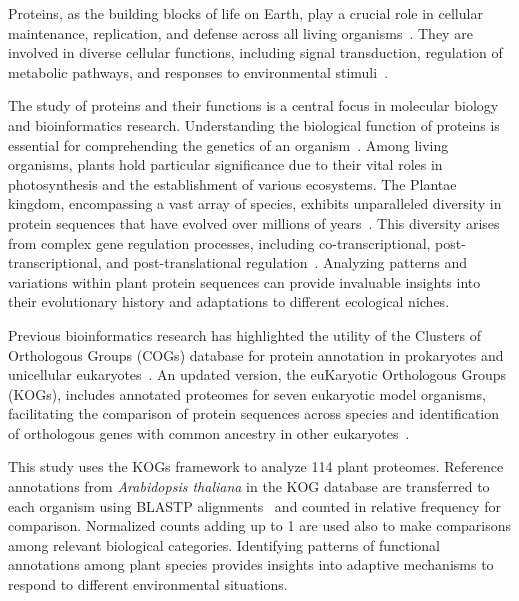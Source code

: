 Proteins, as the building blocks of life on Earth, play a crucial 
role in cellular maintenance, replication, and defense across all 
living organisms~\citep{kaur2022}. They are involved in diverse 
cellular functions, including signal transduction, regulation 
of metabolic pathways, and responses to environmental 
stimuli~\citep{zhang2010}.

The study of proteins and their functions is a central focus in 
molecular biology and bioinformatics research. Understanding the 
biological function of proteins is essential for comprehending 
the genetics of an organism~\citep{silva2020}. Among living 
organisms, plants hold particular significance due to their 
vital roles in photosynthesis and the establishment of various 
ecosystems. The Plantae kingdom, encompassing a vast array of 
species, exhibits unparalleled diversity in protein sequences 
that have evolved over millions of years~\citep{chaudhary2019}. 
This diversity arises from complex gene regulation processes, 
including co-transcriptional, post-transcriptional, and 
post-translational regulation~\citep{skelly2016}. Analyzing 
patterns and variations within plant protein sequences can 
provide invaluable insights into their evolutionary history 
and adaptations to different ecological niches.

Previous bioinformatics research has highlighted the utility 
of the Clusters of Orthologous Groups (COGs) database for 
protein annotation in prokaryotes and unicellular 
eukaryotes~\citep{tatusov1997,tatusov2001}. An updated version, 
the euKaryotic Orthologous Groups (KOGs), includes annotated 
proteomes for seven eukaryotic model organisms, facilitating 
the comparison of protein sequences across species and 
identification of orthologous genes with common ancestry in 
other eukaryotes~\citep{tatusov2003,yang2023,wangC2023,wangT2023}.

This study uses the KOGs framework to analyze 114 plant 
proteomes. 
Reference annotations from \emph{Arabidopsis 
thaliana} in the KOG database are transferred to each 
organism using BLASTP alignments~\citep{camacho2009} 
and counted in relative frequency for comparison. 
Normalized counts adding up to 1 are used also to make 
comparisons among relevant biological categories.
Identifying patterns of functional annotations among 
plant species provides insights into adaptive 
mechanisms to respond to different environmental 
situations.
